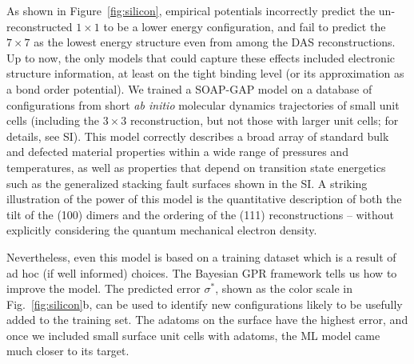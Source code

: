 \documentclass[12pt]{article}
\begin{document}
%
%

As shown in Figure~\ref{fig:silicon}, 
empirical potentials incorrectly predict the 
un-reconstructed $1\times 1$ to be a lower 
energy configuration, and fail to predict the $7\times7$ as the lowest energy structure even from among the DAS reconstructions. Up to now, the only models that
could capture these effects included electronic 
structure information, at least on the tight binding level (or its 
approximation as a bond order potential).
We trained a SOAP-GAP model on a database of configurations from short {\em ab initio} molecular dynamics trajectories of small unit cells {(including the $3\times 3$ reconstruction, but not those with larger unit cells; for details, see SI)}. 
%
This model correctly describes
a broad array of standard bulk and defected material properties within a wide range of pressures and temperatures, {as well as properties that depend on transition state energetics such as the generalized stacking fault surfaces shown in the SI}. A striking illustration of the power of this model
is the quantitative description of both the tilt of the (100) dimers and the 
ordering of the (111) reconstructions -- without explicitly considering the quantum mechanical
electron density. 

Nevertheless, even this model is based on a training dataset which is a result of ad hoc (if well informed) choices. The Bayesian GPR framework tells us how to improve the model. The predicted error $\sigma^*$, shown as the color scale in 
Fig.~\ref{fig:silicon}b, can be used to identify new configurations likely to be usefully added to the training set. The adatoms on the surface have the highest error, {and once we included small surface unit cells with adatoms, the ML model came much closer to its target}.
\end{document}

